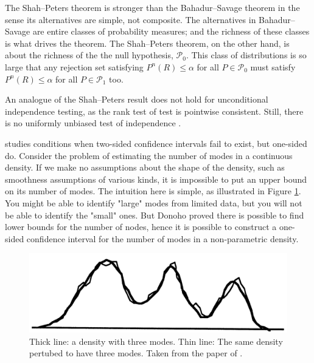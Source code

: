 The Shah--Peters theorem is stronger than the Bahadur--Savage theorem in the sense its alternatives are simple, not composite. The alternatives in Bahadur--Savage are entire classes of probability measures; and the richness of these classes is what drives the theorem. The Shah--Peters theorem, on the other hand, is about the richness of the the null hypothesis, $\mathcal{P}_{0}$. This class of distributions is so large that any rejection set satisfying $P^{n}(R)\leq\alpha$ for all $P\in\mathcal{P}_{0}$ must satisfy $P^{n}(R)\leq\alpha$ for all $P\in\mathcal{P}_{1}$ too.

An analogue of the Shah--Peters result does not hold for unconditional independence testing, as the rank test of \textcite{Hoeffding1948-nm} test is pointwise consistent. Still, there is no uniformly unbiased test of independence \parencite{Moss2020-bc}.

\textcite{Donoho1988-hg} studies conditions when two-sided confidence intervals fail to exist, but one-sided do. Consider the problem of estimating the number of modes in a continuous density. If we make no assumptions about the shape of the density, such as smoothness assumptions of various kinds, it is impossible to put an upper bound on its number of modes. The intuition here is simple, as illustrated in Figure \ref{fig:donoho}. You might be able to identify "large" modes from limited data, but you will not be able to identify the "small" ones. But Donoho proved there is possible to find lower bounds for the number of nodes, hence it is possible to construct a one-sided confidence interval for the number of modes in a non-parametric density.

\begin{figure}
    \centering
    \includegraphics[scale=0.16]{chunks/donoho.png}
    \caption{Thick line: a density with three modes. Thin line: The same density pertubed to have three modes. Taken from the paper of \textcite{Donoho1988-hg}.}
    \label{fig:donoho}
\end{figure}

